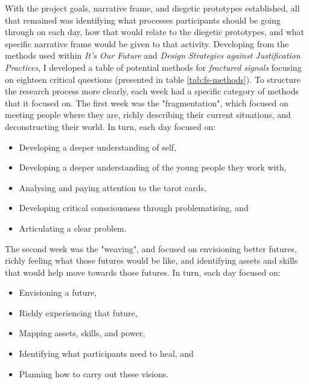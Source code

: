 With the project goals, narrative frame, and diegetic prototypes established, all that remained was identifying what processes participants should be going through on each day, how that would relate to the diegetic prototypes, and what specific narrative frame would be given to that activity. Developing from the methods used within \textit{It’s Our Future} and \textit{Design Strategies against Justification Practices}, I developed a table of potential methods for \textit{fractured signals} focusing on eighteen critical questions (presented in table \ref{tab:fs-methods}). To structure the research process more clearly, each week had a specific category of methods that it focused on. The first week was the "fragmentation", which focused on meeting people where they are, richly describing their current situations, and deconstructing their world. In turn, each day focused on:
\begin{itemize}
    \item Developing a deeper understanding of self,
    \item Developing a deeper understanding of the young people they work with,
    \item Analysing and paying attention to the tarot cards,
    \item Developing critical consciousness through problematising, and
    \item Articulating a clear problem.
\end{itemize}
The second week was the "weaving", and focused on envisioning better futures, richly feeling what those futures would be like, and identifying assets and skills that would help move towards those futures. In turn, each day focused on:
\begin{itemize}
    \item Envisioning a future,
    \item Richly experiencing that future,
    \item Mapping assets, skills, and power,
    \item Identifying what participants need to heal, and
    \item Planning how to carry out these visions.
\end{itemize}

